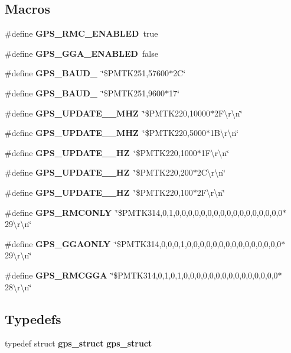 \subsection*{Macros}
\begin{DoxyCompactItemize}
\item 
\#define \textbf{ G\+P\+S\+\_\+\+R\+M\+C\+\_\+\+E\+N\+A\+B\+L\+ED}~true
\item 
\#define \textbf{ G\+P\+S\+\_\+\+G\+G\+A\+\_\+\+E\+N\+A\+B\+L\+ED}~false
\item 
\#define \textbf{ G\+P\+S\+\_\+\+B\+A\+U\+D\+\_}~\char`\"{}\$P\+M\+T\+K251,57600$\ast$2\+C\char`\"{}
\item 
\#define \textbf{ G\+P\+S\+\_\+\+B\+A\+U\+D\+\_}~\char`\"{}\$P\+M\+T\+K251,9600$\ast$17\char`\"{}
\item 
\#define \textbf{ G\+P\+S\+\_\+\+U\+P\+D\+A\+T\+E\+\_\+\_\+\+M\+HZ}~\char`\"{}\$P\+M\+T\+K220,10000$\ast$2\+F\textbackslash{}r\textbackslash{}n\char`\"{}
\item 
\#define \textbf{ G\+P\+S\+\_\+\+U\+P\+D\+A\+T\+E\+\_\+\_\+\+M\+HZ}~\char`\"{}\$P\+M\+T\+K220,5000$\ast$1\+B\textbackslash{}r\textbackslash{}n\char`\"{}
\item 
\#define \textbf{ G\+P\+S\+\_\+\+U\+P\+D\+A\+T\+E\+\_\+\_\+\+HZ}~\char`\"{}\$P\+M\+T\+K220,1000$\ast$1\+F\textbackslash{}r\textbackslash{}n\char`\"{}
\item 
\#define \textbf{ G\+P\+S\+\_\+\+U\+P\+D\+A\+T\+E\+\_\+\_\+\+HZ}~\char`\"{}\$P\+M\+T\+K220,200$\ast$2\+C\textbackslash{}r\textbackslash{}n\char`\"{}
\item 
\#define \textbf{ G\+P\+S\+\_\+\+U\+P\+D\+A\+T\+E\+\_\+\_\+\+HZ}~\char`\"{}\$P\+M\+T\+K220,100$\ast$2\+F\textbackslash{}r\textbackslash{}n\char`\"{}
\item 
\#define \textbf{ G\+P\+S\+\_\+\+R\+M\+C\+O\+N\+LY}~\char`\"{}\$P\+M\+T\+K314,0,1,0,0,0,0,0,0,0,0,0,0,0,0,0,0,0,0,0$\ast$29\textbackslash{}r\textbackslash{}n\char`\"{}
\item 
\#define \textbf{ G\+P\+S\+\_\+\+G\+G\+A\+O\+N\+LY}~\char`\"{}\$P\+M\+T\+K314,0,0,0,1,0,0,0,0,0,0,0,0,0,0,0,0,0,0,0$\ast$29\textbackslash{}r\textbackslash{}n\char`\"{}
\item 
\#define \textbf{ G\+P\+S\+\_\+\+R\+M\+C\+G\+GA}~\char`\"{}\$P\+M\+T\+K314,0,1,0,1,0,0,0,0,0,0,0,0,0,0,0,0,0,0,0$\ast$28\textbackslash{}r\textbackslash{}n\char`\"{}
\end{DoxyCompactItemize}
\subsection*{Typedefs}
\begin{DoxyCompactItemize}
\item 
typedef struct \textbf{ gps\+\_\+struct} \textbf{ gps\+\_\+struct}
\end{DoxyCompactItemize}
